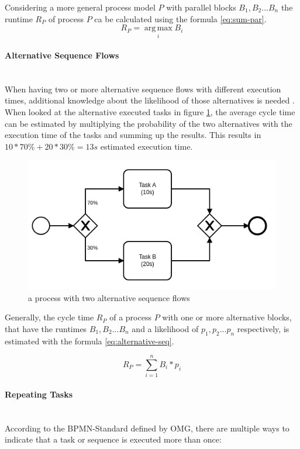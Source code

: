 Considering a more general process model $P$ with parallel blocks $B_1,B_2 ... B_n$ the runtime $R_P$ of process $P$ ca be calculated using the formula \ref{eq:sum-par}. 
\begin{equation}\label{eq:sum-par}
	R_P = \operatorname*{arg\,max}_i B_i
\end{equation}

\paragraph{Alternative Sequence Flows}~\\
When having two or more alternative sequence flows with different execution times, additional knowledge about the likelihood of those alternatives is needed \cite{fundamentals}. When looked at the alternative executed tasks in figure \ref{fig:alternative-tasks}, the average cycle time can be estimated by multiplying the probability of the two alternatives with the execution time of the tasks and summing up the results. This results in $10 * 70\% + 20 * 30\% = 13s$ estimated execution time. 

\begin{figure}[H]
	\centering
	\includegraphics[width=0.5\columnwidth]{graphics/alternative-tasks}
	\caption{a process with two alternative sequence flows} 
	\label{fig:alternative-tasks} 
\end{figure}

Generally, the cycle time $R_P$ of a process $P$ with one or more alternative blocks, that have the runtimes $B_1,B_2 ... B_n$ and a likelihood of $p_1,p_2 ... p_n$ respectively, is estimated with the formula \ref{eq:alternative-seq}. \cite{fundamentals}

\begin{equation}\label{eq:alternative-seq}
	R_P = \displaystyle\sum_{i=1}^{n} B_i * p_i
\end{equation}

\paragraph{Repeating Tasks}~\\
According to the BPMN-Standard\cite{bpmnstandard} defined by OMG, there are multiple ways to indicate that a task or sequence is executed more than once: 

